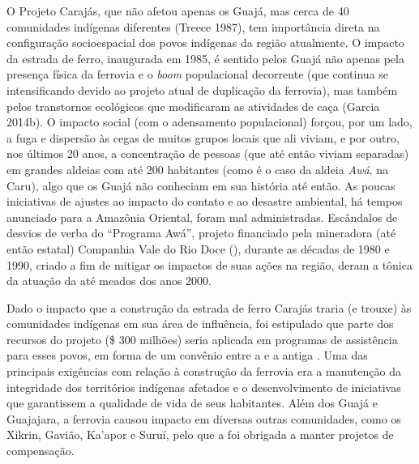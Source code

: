 O Projeto Carajás, que não afetou apenas os Guajá, mas cerca de 40
comunidades indígenas diferentes (Treece 1987), tem importância direta
na configuração socioespacial dos povos indígenas da região atualmente.
O impacto da estrada de ferro, inaugurada em 1985, é sentido pelos Guajá
não apenas pela presença física da ferrovia e o \emph{boom} populacional
decorrente (que continua se intensificando devido ao projeto atual de
duplicação da ferrovia), mas também pelos transtornos ecológicos que
modificaram as atividades de caça (Garcia 2014b). O impacto social (com
o adensamento populacional) forçou, por um lado, a fuga e dispersão às
cegas de muitos grupos locais que ali viviam, e por outro, nos últimos
20 anos, a concentração de pessoas (que até então viviam separadas) em
grandes aldeias com até 200 habitantes (como é o caso da aldeia
\emph{Awá}, na  Caru), algo que os Guajá não conheciam em sua história
até então. As poucas iniciativas de ajustes ao impacto do contato e ao
desastre ambiental, há tempos anunciado para a Amazônia Oriental, foram
mal administradas. Escândalos de desvios de verba do ``Programa Awá'',
projeto financiado pela mineradora (até então estatal) Companhia Vale do
Rio Doce (), durante as décadas de 1980 e 1990, criado a fim de
mitigar os impactos de suas ações na região, deram a tônica da atuação
da  até meados dos anos 2000.

Dado o impacto que a construção da estrada de ferro Carajás traria (e
trouxe) às comunidades indígenas em sua área de influência, foi
estipulado que parte dos recursos do projeto (\$ 300 milhões) seria
aplicada em programas de assistência para esses povos, em forma de um
convênio entre a  e a antiga . Uma das principais exigências
com relação à construção da ferrovia era a manutenção da integridade dos
territórios indígenas afetados e o desenvolvimento de iniciativas que
garantissem a qualidade de vida de seus habitantes. Além dos Guajá e
Guajajara, a ferrovia causou impacto em diversas outras comunidades,
como os Xikrin, Gavião, Ka'apor e Suruí, pelo que a  foi obrigada a
manter projetos de compensação.

